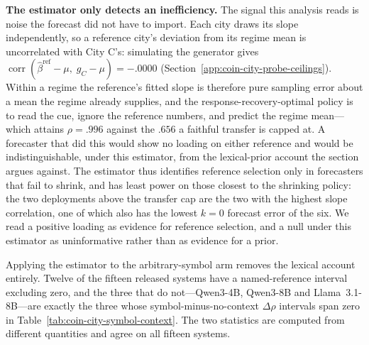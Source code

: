 \noindent\textbf{The estimator only detects an inefficiency.} The signal this analysis
reads is noise the forecast did not have to import. Each city draws its slope
independently, so a reference city's deviation from its regime mean is
uncorrelated with City C's: simulating the generator gives
$\operatorname{corr}(\widehat\beta^{\mathrm{ref}}-\mu,\;g_C-\mu)=-.0000$
(Section~\ref{app:coin-city-probe-ceilings}). Within a regime the reference's
fitted slope is therefore pure sampling error about a mean the regime already
supplies, and the response-recovery-optimal policy is to read the cue, ignore the
reference numbers, and predict the regime mean---which attains $\rho=.996$ against
the $.656$ a faithful transfer is capped at. A forecaster that did this would show
no loading on either reference and would be indistinguishable, under this
estimator, from the lexical-prior account the section argues against. The
estimator thus identifies reference selection only in forecasters that fail to
shrink, and has least power on those closest to the shrinking policy: the two
deployments above the transfer cap are the two with the highest slope
correlation, one of which also has the lowest $k=0$ forecast error of the six. We read a
positive loading as evidence for reference selection, and a null under this
estimator as uninformative rather than as evidence for a prior.

\begin{center}
\begin{minipage}{\linewidth}
\centering
{}
\label{tab:coin-city-reference-selection-symbol}
\small
\setlength{\tabcolsep}{4pt}

\end{minipage}
\end{center}

Applying the estimator to the arbitrary-symbol arm removes the lexical account
entirely. Twelve of the fifteen released systems have a named-reference interval
excluding zero, and the three that do not---Qwen3-4B, Qwen3-8B and
Llama~3.1-8B---are exactly the three whose symbol-minus-no-context $\Delta\rho$
intervals span zero in Table~\ref{tab:coin-city-symbol-context}. The two
statistics are computed from different quantities and agree on all fifteen
systems.

